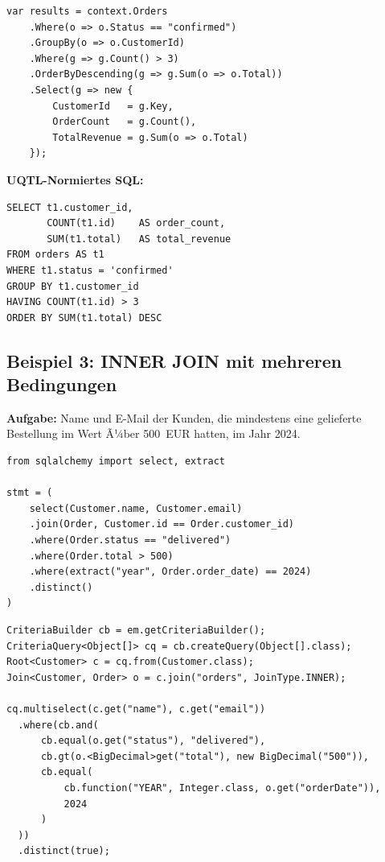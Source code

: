 \begin{lstlisting}[style=csharpstyle, caption={Beispiel 2 -- C\#},
  label=lst:bsp2_cs]
var results = context.Orders
    .Where(o => o.Status == "confirmed")
    .GroupBy(o => o.CustomerId)
    .Where(g => g.Count() > 3)
    .OrderByDescending(g => g.Sum(o => o.Total))
    .Select(g => new {
        CustomerId   = g.Key,
        OrderCount   = g.Count(),
        TotalRevenue = g.Sum(o => o.Total)
    });
\end{lstlisting}

\begin{successbox}
\textbf{UQTL-Normiertes SQL:}
\begin{lstlisting}[style=sqlstyle, numbers=none]
SELECT t1.customer_id,
       COUNT(t1.id)    AS order_count,
       SUM(t1.total)   AS total_revenue
FROM orders AS t1
WHERE t1.status = 'confirmed'
GROUP BY t1.customer_id
HAVING COUNT(t1.id) > 3
ORDER BY SUM(t1.total) DESC
\end{lstlisting}
\end{successbox}

\subsection{Beispiel 3: INNER JOIN mit mehreren Bedingungen}
\label{subsec:bsp3}

\textbf{Aufgabe:} Name und E-Mail der Kunden, die mindestens eine
gelieferte Bestellung im Wert Ã¼ber 500~EUR hatten, im Jahr 2024.

\begin{lstlisting}[style=pythonstyle, caption={Beispiel 3 -- Python (JOIN)},
  label=lst:bsp3_py]
from sqlalchemy import select, extract

stmt = (
    select(Customer.name, Customer.email)
    .join(Order, Customer.id == Order.customer_id)
    .where(Order.status == "delivered")
    .where(Order.total > 500)
    .where(extract("year", Order.order_date) == 2024)
    .distinct()
)
\end{lstlisting}

\begin{lstlisting}[style=javastyle, caption={Beispiel 3 -- Java (JOIN)},
  label=lst:bsp3_java]
CriteriaBuilder cb = em.getCriteriaBuilder();
CriteriaQuery<Object[]> cq = cb.createQuery(Object[].class);
Root<Customer> c = cq.from(Customer.class);
Join<Customer, Order> o = c.join("orders", JoinType.INNER);

cq.multiselect(c.get("name"), c.get("email"))
  .where(cb.and(
      cb.equal(o.get("status"), "delivered"),
      cb.gt(o.<BigDecimal>get("total"), new BigDecimal("500")),
      cb.equal(
          cb.function("YEAR", Integer.class, o.get("orderDate")),
          2024
      )
  ))
  .distinct(true);
\end{lstlisting}

